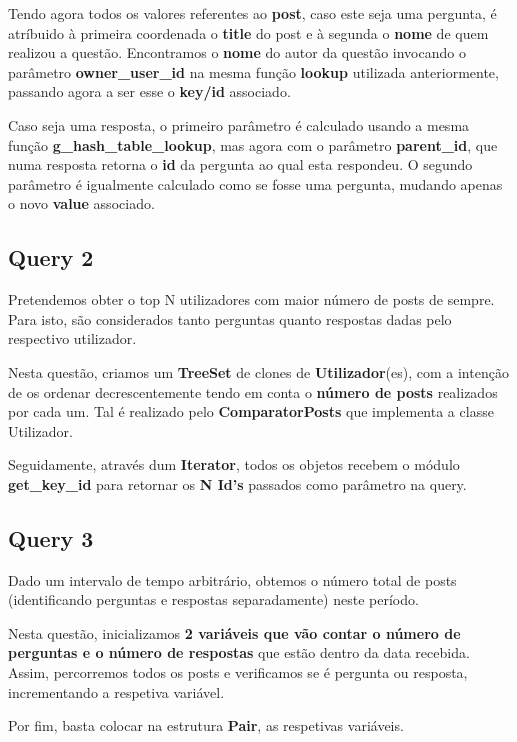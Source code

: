 \documentclass[a4paper]{article}
\begin{document}
Tendo agora todos os valores referentes ao \textbf{post}, caso este
seja uma pergunta, é atríbuido à primeira coordenada o \textbf{title}
do post e à segunda o \textbf{nome} de quem realizou a questão.
Encontramos o \textbf{nome} do autor da questão invocando o parâmetro
\textbf{owner\_user\_id} na mesma função \textbf{lookup} utilizada 
anteriormente, passando agora a ser esse o \textbf{key/id} associado.

Caso seja uma resposta, o primeiro parâmetro é calculado usando a mesma 
função \textbf{g\_hash\_table\_lookup}, mas agora com o 
parâmetro \textbf{parent\_id}, que numa resposta retorna o \textbf{id} 
da pergunta ao qual esta respondeu. O segundo parâmetro é igualmente
calculado como se fosse uma pergunta, mudando apenas o novo 
\textbf{value} associado.

\subsection{Query 2}

Pretendemos obter o top N utilizadores com maior número de posts de 
sempre. Para isto, são considerados tanto perguntas quanto respostas 
dadas pelo respectivo utilizador.

Nesta questão, criamos um \textbf{TreeSet} de clones de 
\textbf{Utilizador}(es), com a intenção de os ordenar decrescentemente 
tendo em conta o \textbf{número de posts} realizados por cada um. 
Tal é realizado pelo \textbf{ComparatorPosts} que implementa a classe
Utilizador.

Seguidamente, através dum \textbf{Iterator}, todos os objetos recebem
o módulo \textbf{get\_key\_id} para retornar os \textbf{N Id's} passados
como parâmetro na query.

\subsection{Query 3}

Dado um intervalo de tempo arbitrário, obtemos o número total de posts 
(identificando perguntas e respostas separadamente) neste período.

Nesta questão, inicializamos \textbf{2 variáveis que vão contar o número de 
perguntas e o número de respostas} que estão dentro da data recebida.
Assim, percorremos todos os posts e verificamos se é pergunta ou resposta,
incrementando a respetiva variável.

Por fim, basta colocar na estrutura \textbf{Pair}, as respetivas variáveis.
\end{document}
